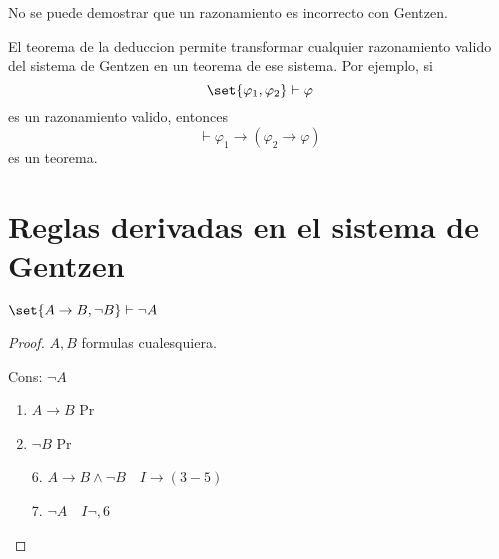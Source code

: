 \begin{remark}
	No se puede demostrar que un razonamiento es incorrecto con Gentzen.
\end{remark}
\begin{remark}
	El teorema de la deduccion permite transformar cualquier razonamiento valido del sistema de Gentzen en un teorema de ese sistema. Por ejemplo, si
	\[
		\set{\varphi_1, \varphi_2 } \vdash \varphi
	\]
	es un razonamiento valido, entonces
	\[
		\vdash \varphi_1 \rightarrow (\varphi_2 \rightarrow \varphi)
	\]
	es un teorema.
\end{remark}

\section{Reglas derivadas en el sistema de Gentzen}
\begin{theorem}
	\(\set{A\rightarrow B, \neg B} \vdash \neg A \)
\end{theorem}
\begin{proof}
	\(A,B \) formulas cualesquiera.

	Cons: \(\neg A \)
	\begin{enumerate}
		\item \(A \rightarrow B \) Pr
		\item \(\neg B \) Pr
	\end{enumerate}
	\begin{enumerate}[resume]
		\item[6.] \(A \rightarrow B \wedge \neg B \quad I\rightarrow(3-5)\)
		\item[7.] \(\neg A \quad I\neg,6\)
	\end{enumerate}
\end{proof}

